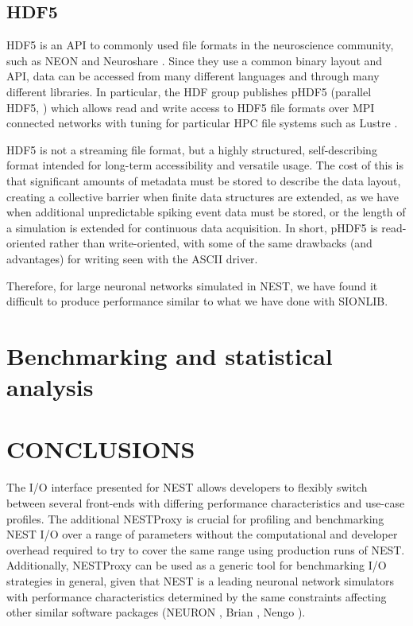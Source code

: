 \documentclass[]{YIC2015}
\begin{document}
\subsection{HDF5}
HDF5 is an API to commonly used file formats in the neuroscience
community, such as NEON \cite{neon} and Neuroshare \cite{neuroshare}.
Since they use a common binary layout and API, data can be accessed
from many different languages and through many different libraries. In
particular, the HDF group publishes pHDF5 (parallel HDF5,
\cite{hdf5}) which allows read and write access to HDF5 file formats
over MPI connected networks with tuning for particular HPC file
systems such as Lustre \cite{lustre}.

HDF5 is not a streaming file format, but a highly structured,
self-describing format intended for long-term accessibility and
versatile usage. The cost of this is that significant amounts of
metadata must be stored to describe the data layout, creating a
collective barrier when finite data structures are extended, as we
have when additional unpredictable spiking event data must be stored,
or the length of a simulation is extended for continuous data
acquisition. In short, pHDF5 is read-oriented rather than
write-oriented, with some of the same drawbacks (and advantages) for
writing seen with the ASCII driver.

Therefore, for large neuronal networks simulated in NEST, we have
found it difficult to produce performance similar to what we have done
with SIONLIB.

\section{Benchmarking and statistical analysis}


\section{CONCLUSIONS}
The I/O interface presented for NEST allows developers to flexibly
switch between several front-ends with differing performance
characteristics and use-case profiles. The additional NESTProxy is
crucial for profiling and benchmarking NEST I/O over a range of
parameters without the computational and developer overhead required
to try to cover the same range using production runs of
NEST. Additionally, NESTProxy can be used as a generic tool for
benchmarking I/O strategies in general, given that NEST is a leading
neuronal network simulators with performance characteristics
determined by the same constraints affecting other similar software
packages (NEURON \cite{neuron}, Brian \cite{brian}, Nengo \cite{nengo}).
\end{document}
